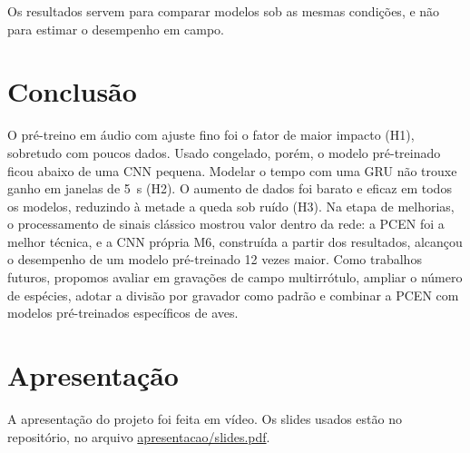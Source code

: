 \documentclass[conference]{IEEEtran}
\begin{document}
Os resultados servem para comparar modelos sob as mesmas condições, e não para estimar o desempenho em campo.

\section{Conclusão}

O pré-treino em áudio com ajuste fino foi o fator de maior impacto (H1), sobretudo com poucos dados. Usado congelado, porém, o modelo pré-treinado ficou abaixo de uma CNN pequena. Modelar o tempo com uma GRU não trouxe ganho em janelas de 5~s (H2). O aumento de dados foi barato e eficaz em todos os modelos, reduzindo à metade a queda sob ruído (H3). Na etapa de melhorias, o processamento de sinais clássico mostrou valor dentro da rede: a PCEN foi a melhor técnica, e a CNN própria M6, construída a partir dos resultados, alcançou o desempenho de um modelo pré-treinado 12 vezes maior. Como trabalhos futuros, propomos avaliar em gravações de campo multirrótulo, ampliar o número de espécies, adotar a divisão por gravador como padrão e combinar a PCEN com modelos pré-treinados específicos de aves.

\section*{Apresentação}

{\raggedright A apresentação do projeto foi feita em vídeo. Os slides usados estão no repositório, no arquivo \url{apresentacao/slides.pdf}.\par}
\end{document}
